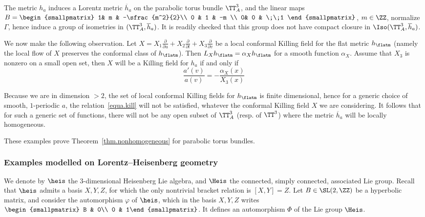 The metric $h_a$ induces a Lorentz metric $\overline{h}_a$ on the parabolic torus bundle $\TT_A^3$, and the linear maps $ B=
\begin{smallpmatrix} 1& m & -\sfrac{m^2}{2}\\ 0 & 1 & -m \\ 0& 0 & \;\;1
\end{smallpmatrix}$, $m \in \ZZ$, normalize $\Gamma$, hence induce a group of isometries in $(\TT_A^3,\overline{h}_a)$. It is readily checked that this group does not have compact closure in $\Iso(\TT_A^3, \overline{h}_a)$.



We now make the following observation. Let $X=X_1 \frac{\partial}{\partial u} +X_2 \frac{\partial}{\partial t}+X_3 \frac{\partial}{\partial v}$ be a local conformal Killing field for the flat metric $h_{\flatm}$ (namely the local flow of $X$ preserves the conformal class of $h_{\flatm}$). Then $L_Xh_{\flatm}=\alpha_X h_{\flatm}$ for a smooth function $\alpha_X$. Assume that $X_3$ is nonzero on a small open set, then $X$ will be a Killing field for $h_a$ if and only if
\begin{equation}\label{equa.kill}
\frac{a'(v)}{a(v)}=-\frac{\alpha_X(x)}{X_3(x)}
\end{equation}

Because we are in dimension $>2$, the set of local conformal Killing fields for $h_{\flatm}$ is finite dimensional, hence for a generic choice of smooth, $1$-periodic $a$, the relation~\eqref{equa.kill} will not be satisfied, whatever the conformal Killing field $X$ we are considering. It follows that for such a generic set of functions, there will not be any open subset of $\TT_A^3$ (resp. of $\TT^3$) where the metric $\overline{h}_a$ will be locally homogeneous.

These examples prove Theorem~\ref{thm.nonhomogeneous} for parabolic torus bundles.

\subsubsection{Examples modelled on Lorentz--Heisenberg geometry}\label{sec.lorentzheisenberg}
We denote by $\heis$ the $3$-dimensional Heisenberg Lie algebra, and $\Heis$ the connected, simply connected, associated Lie group. Recall that $\heis$ admits a basis $X,Y,Z$, for which the only nontrivial bracket relation is $[X,Y]=Z$. Let $B \in \SL(2,\ZZ)$ be a hyperbolic matrix, and consider the automorphism $\varphi$ of $\heis$, which in the basis $X,Y,Z$ writes $\begin{smallpmatrix} B & 0\\ 0 & 1\end{smallpmatrix} $. It defines an automorphism $\Phi$ of the Lie group
$\Heis$.

